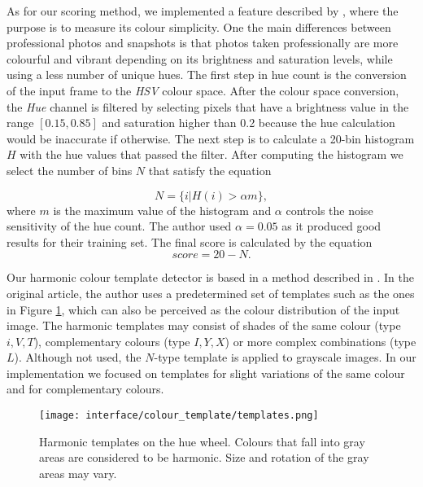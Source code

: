 As for our scoring method, we implemented a feature described by \citeauthor{ke2006design} \cite{ke2006design}, where the purpose is to measure its colour simplicity. One the main differences between professional photos and snapshots is that photos taken professionally are more colourful and vibrant depending on its brightness and saturation levels, while using a less number of unique hues. The first step in hue count is the conversion of the input frame to the \emph{HSV} colour space. After the colour space conversion, the \emph{Hue} channel is filtered by selecting pixels that have a brightness value in the range $[0.15,0.85]$ and saturation higher than 0.2 because the hue calculation would be inaccurate if otherwise. The next step is to calculate a 20-bin histogram $H$ with the hue values that passed the filter. After computing the histogram we select the number of bins $N$ that satisfy the equation

\begin{equation}
N = \{i | H(i) > \alpha m\},
\end{equation}
where $m$ is the maximum value of the histogram and $\alpha$ controls the noise sensitivity of the hue count. The author used $\alpha = 0.05$ as it produced good results for their training set. The final score is calculated by the equation
\begin{equation}
score = 20 - N.
\end{equation}

Our harmonic colour template detector is based in a method described in \cite{cohen2006color}. In the original article, the author uses a predetermined set of templates such as the ones in Figure \ref{fig:templates}, which can also be perceived as the colour distribution of the input image. The harmonic templates may consist of shades of the same colour (type $i, V, T$), complementary colours (type $I, Y, X$) or more complex combinations (type $L$). Although not used, the $N$-type template is applied to grayscale images. In our implementation we focused on templates for slight variations of the same colour and for complementary colours.

\begin{figure}[htb]
	\centering
	\texttt{[image: interface/colour\_template/templates.png]}
  	\caption{Harmonic templates on the hue wheel. Colours that fall into gray areas are considered to be harmonic. Size and rotation of the gray areas may vary.}
	\label{fig:templates}
\end{figure}

